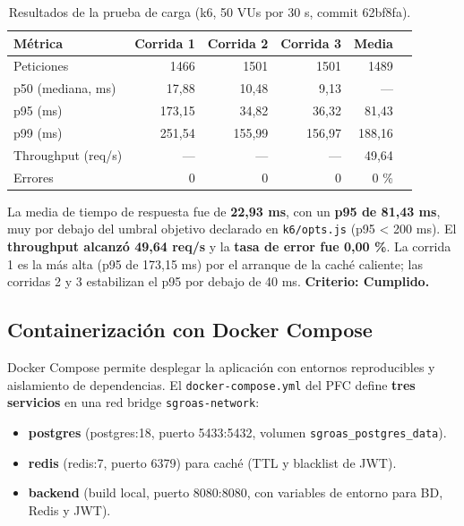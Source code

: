 \begin{table}[H]
\centering
\small
\begin{tabular}{@{}lrrrrr@{}}
\toprule
\textbf{Métrica} & \textbf{Corrida 1} & \textbf{Corrida 2} & \textbf{Corrida 3} & \textbf{Media} \\
\midrule
Peticiones & 1466 & 1501 & 1501 & 1489 \\
p50 (mediana, ms) & 17,88 & 10,48 & 9,13 & --- \\
p95 (ms) & 173,15 & 34,82 & 36,32 & 81,43 \\
p99 (ms) & 251,54 & 155,99 & 156,97 & 188,16 \\
Throughput (req/s) & --- & --- & --- & 49,64 \\
Errores & 0 & 0 & 0 & 0 \% \\
\bottomrule
\end{tabular}
\caption{Resultados de la prueba de carga (k6, 50 VUs por 30 s, commit 62bf8fa).}
\label{tab:perf}
\end{table}

La media de tiempo de respuesta fue de \textbf{22,93 ms}, con un \textbf{p95 de 81,43 ms}, muy por debajo del
umbral objetivo declarado en \texttt{k6/opts.js} (p95 < 200 ms). El \textbf{throughput alcanzó 49,64 req/s} y la
\textbf{tasa de error fue 0,00 \%}. La corrida 1 es la más alta (p95 de 173,15 ms) por el arranque de la caché
caliente; las corridas 2 y 3 estabilizan el p95 por debajo de 40 ms. \textbf{Criterio: Cumplido.}

\subsection{Containerización con Docker Compose}

Docker Compose permite desplegar la aplicación con entornos reproducibles y aislamiento de dependencias. El
\texttt{docker-compose.yml} del PFC define \textbf{tres servicios} en una red bridge \texttt{sgroas-network}:
\begin{itemize}
    \item \textbf{postgres} (postgres:18, puerto 5433:5432, volumen \texttt{sgroas\_postgres\_data}).
    \item \textbf{redis} (redis:7, puerto 6379) para caché (TTL y blacklist de JWT).
    \item \textbf{backend} (build local, puerto 8080:8080, con variables de entorno para BD, Redis y JWT).
\end{itemize}

